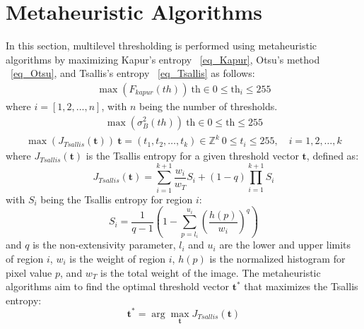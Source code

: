 \documentclass{elsarticle}
\begin{document}
\section{Metaheuristic Algorithms}
\noindent In this section, multilevel thresholding is performed using metaheuristic algorithms by maximizing Kapur's entropy ~\ref{eq_Kapur}, Otsu's method ~\ref{eq_Otsu}, and Tsallis's entropy ~\ref{eq_Tsallis} as follows:
\begin{equation}
\begin{gathered}
\max(F_{kapur}(th)) \
\text{th} \in 0 \leq \text{th}_i \leq 255
\end{gathered}
\label{eq_Kapur}
\end{equation}
\noindent where $i=[1,2,...,n]$, with $n$ being the number of thresholds.
\begin{equation}
\begin{gathered}
\max(\sigma_B^2(th)) \
\text{th} \in 0 \leq \text{th} \leq 255
\end{gathered}
\label{eq_Otsu}
\end{equation}
\begin{equation}
\begin{gathered}
\max(J_{Tsallis}(\mathbf{t})) \
\mathbf{t} = (t_1, t_2, \dots, t_k) \in \mathbb{Z}^k \
0 \leq t_i \leq 255, \quad i = 1, 2, \dots, k
\end{gathered}
\label{eq_Tsallis}
\end{equation}
\noindent where $J_{Tsallis}(\mathbf{t})$ is the Tsallis entropy for a given threshold vector $\mathbf{t}$, defined as:
\begin{equation}
J_{Tsallis}(\mathbf{t}) = \sum_{i=1}^{k+1} \frac{w_i}{w_T} S_i + (1-q) \prod_{i=1}^{k+1} S_i
\end{equation}
\noindent with $S_i$ being the Tsallis entropy for region $i$:
\begin{equation}
S_i = \frac{1}{q-1}\left(1 - \sum_{p=l_i}^{u_i} \left(\frac{h(p)}{w_i}\right)^q\right)
\end{equation}
\noindent and $q$ is the non-extensivity parameter, $l_i$ and $u_i$ are the lower and upper limits of region $i$, $w_i$ is the weight of region $i$, $h(p)$ is the normalized histogram for pixel value $p$, and $w_T$ is the total weight of the image.
The metaheuristic algorithms aim to find the optimal threshold vector $\mathbf{t}^*$ that maximizes the Tsallis entropy:
\begin{equation}
\mathbf{t}^* = \arg\max_{\mathbf{t}} J_{Tsallis}(\mathbf{t})
\end{equation}
\end{document}
